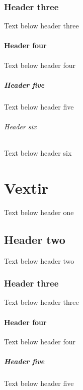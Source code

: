 \documentclass[a4paper,10pt,icelandic]{sphinxmanual}
\begin{document}
\subsection{Header three}
\label{\detokenize{fjarmalastjornun/index:header-three}}
\sphinxAtStartPar
Text below header three


\subsubsection{Header four}
\label{\detokenize{fjarmalastjornun/index:header-four}}
\sphinxAtStartPar
Text below header four


\paragraph{Header five}
\label{\detokenize{fjarmalastjornun/index:header-five}}
\sphinxAtStartPar
Text below header five


\subparagraph{Header six}
\label{\detokenize{fjarmalastjornun/index:header-six}}
\sphinxAtStartPar
Text below header six

\sphinxstepscope


\chapter{Vextir}
\label{\detokenize{vextir/index:vextir}}\label{\detokenize{vextir/index::doc}}
\sphinxAtStartPar
Text below header one


\section{Header two}
\label{\detokenize{vextir/index:header-two}}
\sphinxAtStartPar
Text below header two


\subsection{Header three}
\label{\detokenize{vextir/index:header-three}}
\sphinxAtStartPar
Text below header three


\subsubsection{Header four}
\label{\detokenize{vextir/index:header-four}}
\sphinxAtStartPar
Text below header four


\paragraph{Header five}
\label{\detokenize{vextir/index:header-five}}
\sphinxAtStartPar
Text below header five
\end{document}
